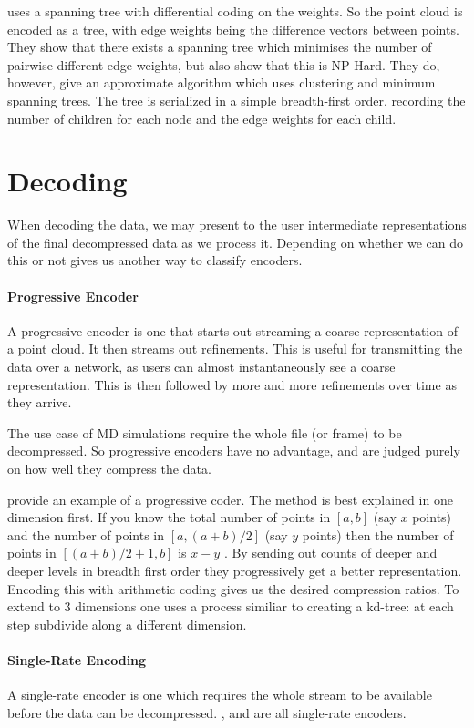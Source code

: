 \documentclass[a4paper]{report}
\begin{document}
\citep{chen2005lcp} uses a spanning tree with differential coding on the
weights. So the point cloud is encoded as a tree, with edge weights being the
difference vectors between points. They show that there exists a spanning tree
which minimises the number of pairwise different edge weights, but also show
that this is NP-Hard. They do, however, give an approximate algorithm which
uses clustering and minimum spanning trees. The tree is serialized in a simple
breadth-first order, recording the number of children for each node and the
edge weights for each child.


\section{Decoding}

When decoding the data, we may present to the user intermediate
representations of the final decompressed data as we process it. Depending on
whether we can do this or not gives us another way to classify encoders.

\paragraph{Progressive Encoder}
A progressive encoder is one that starts out streaming a coarse representation
of a point cloud. It then streams out refinements. This is useful for
transmitting the data over a network, as users can almost instantaneously see
a coarse representation. This is then followed by more and more refinements
over time as they arrive.

The use case of MD simulations require the whole file (or frame) to be
decompressed. So progressive encoders have no advantage, and are judged purely
on how well they compress the data.

\citep{devillers2000gci} provide an example of a progressive coder. The method
is best explained in one dimension first. If you know the total number of
points in $[a, b]$ (say $x$ points) and the number of points in $[a, (a+b)/2]$
(say $y$ points) then the number of points in $[(a+b)/2+1, b]$ is $x - y$ . By
sending out counts of deeper and deeper levels in breadth first order they
progressively get a better representation. Encoding this with arithmetic
coding gives us the desired compression ratios. To extend to 3 dimensions one
uses a process similiar to creating a kd-tree: at each step subdivide along a
different dimension.

\paragraph{Single-Rate Encoding}
A single-rate encoder is one which requires the whole stream to be available
before the data can be decompressed. \citep{omeltchenko2000sls},
\citep{gumholdcomp} and \citep{merrycomp} are all single-rate encoders.
\end{document}
